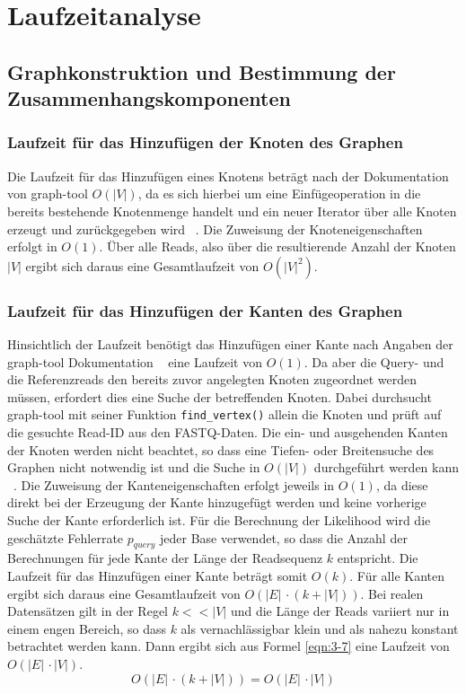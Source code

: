 \chapter{Laufzeitanalyse} \label{sec:}
\section{Graphkonstruktion und Bestimmung der Zusammenhangskomponenten} \label{sec:}
\subsection{Laufzeit für das Hinzufügen der Knoten des Graphen} \label{subsec:}
Die Laufzeit für das Hinzufügen eines Knotens beträgt nach der Dokumentation von graph-tool  $ O(|V|) $, da es sich hierbei um eine Einfügeoperation in die bereits bestehende Knotenmenge handelt und ein neuer Iterator über alle Knoten erzeugt und zurückgegeben wird ~\cite{docs_graph_tool}. Die Zuweisung der Knoteneigenschaften erfolgt in $ O(1) $. Über alle Reads, also über die resultierende Anzahl der Knoten $ |V| $ ergibt sich daraus eine Gesamtlaufzeit von $ O(|V|^2) $.\\

\subsection{Laufzeit für das Hinzufügen der Kanten des Graphen} \label{subsec:}

Hinsichtlich der Laufzeit benötigt das Hinzufügen einer Kante nach Angaben der graph-tool Dokumentation ~\cite{docs_graph_tool} eine Laufzeit von $ O(1) $. Da aber die Query- und die Referenzreads den bereits zuvor angelegten Knoten zugeordnet werden müssen, erfordert dies eine Suche der betreffenden Knoten. Dabei durchsucht graph-tool mit seiner Funktion \lstinline|find_vertex()| allein die Knoten und prüft auf die gesuchte Read-ID aus den FASTQ-Daten. Die ein- und ausgehenden Kanten der Knoten werden nicht beachtet, so dass eine Tiefen- oder Breitensuche des Graphen nicht notwendig ist und die Suche in $ O(|V|) $ durchgeführt werden kann ~\cite{graph_tool_coplexity_find_vertex}. Die Zuweisung der Kanteneigenschaften erfolgt jeweils in $ O(1) $, da diese direkt bei der Erzeugung der Kante hinzugefügt werden und keine vorherige Suche der Kante erforderlich ist. Für die Berechnung der Likelihood wird die geschätzte Fehlerrate $ p_{query} $ jeder Base verwendet, so dass die Anzahl der Berechnungen für jede Kante der Länge der Readsequenz $ k $ entspricht. Die Laufzeit für das Hinzufügen einer Kante beträgt somit $ O(k) $. Für alle Kanten ergibt sich daraus eine Gesamtlaufzeit von $ O(|E|\, \cdotp (k + |V|)) $. Bei realen Datensätzen gilt in der Regel $ k << |V| $ und die Länge der Reads variiert nur in einem engen Bereich, so dass $ k $ als vernachlässigbar klein und als nahezu konstant betrachtet werden kann. Dann ergibt sich aus Formel \eqref{eqn:3-7} eine Laufzeit von $O(|E|\, \cdotp |V|) $. 
\begin{equation} \label{eqn:3-7}
\tag{3-7}
O(|E|\, \cdotp (k + |V|)) = O(|E|\, \cdotp |V|)
\end{equation}

